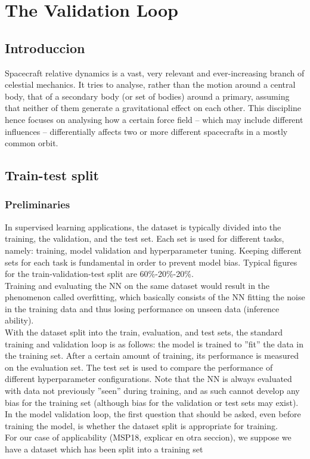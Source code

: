 \chapter{The Validation Loop}
%
\label{chap:Chap_1}
%
%
\section{Introduccion}
%
\indent Spacecraft relative dynamics is a vast, very relevant and ever-increasing branch of celestial mechanics. It tries to analyse, rather than the motion around a central body, that of a secondary body (or set of bodies) around a primary, assuming that neither of them generate a gravitational effect on each other. This discipline hence focuses on analysing how a certain force field -- which may include different influences -- differentially affects two or more different spacecrafts in a mostly common orbit.\\
%
\section{Train-test split}
\subsection{Preliminaries}
\indent In supervised learning applications, the dataset is typically divided into the training, the validation, and the test set. Each set is used for different tasks, namely: training, model validation and hyperparameter tuning. Keeping different sets for each task is fundamental in order to prevent model bias. Typical figures for the train-validation-test split are 60\%-20\%-20\%\cite[pp. 20-21]{Marsland2015Machine}.\\
%
\indent Training and evaluating the NN on the same dataset would result in the phenomenon called overfitting\cite[pp. 19-20]{Marsland2015Machine}, which basically consists of the NN fitting the noise in the training data and thus losing performance on unseen data (inference ability).\\
%
\indent With the dataset split into the train, evaluation, and test sets, the standard training and validation loop is as follows: the model is trained to ''fit'' the data in the training set. After a certain amount of training, its performance is measured on the evaluation set. The test set is used to compare the performance of different hyperparameter configurations. Note that the NN is always evaluated with data not previously ''seen'' during training, and as such cannot develop any bias for the training set (although bias for the validation or test sets may exist).\\
%
\indent In the model validation loop, the first question that should be asked, even before training the model, is whether the dataset split is appropriate for training.\\
%
\indent For our case of applicability (MSP18, explicar en otra seccion), we suppose we have a dataset which has been split into a training set

